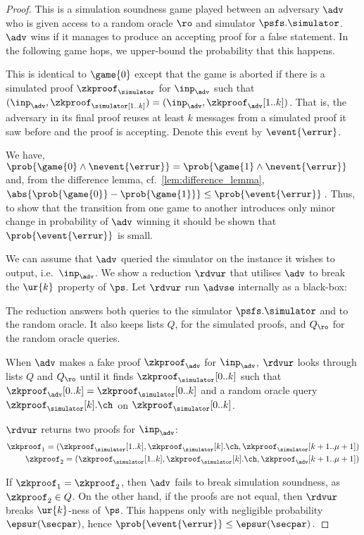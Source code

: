\begin{proof}
	 This is a simulation soundness game played between an adversary
	$\adv$ who is given access to a random oracle $\ro$ and simulator
	$\psfs.\simulator$. $\adv$ wins if it manages to produce an accepting proof
	for a false statement. In the following game hops, we upper-bound the
	probability that this happens.
	
	 This is identical to $\game{0}$ except that the game is aborted if
	there is a simulated proof $\zkproof_\simulator$ for $\inp_{\adv}$ such that
	$(\inp_{\adv}, \zkproof_\simulator[1..k]) = (\inp_{\adv},
	\zkproof_{\adv}[1..k])$. That is, the adversary in its final proof reuses at
	least $k$ messages from a simulated proof it saw before and the proof is
	accepting.  Denote this event by $\event{\errur}$.
	
	 We have, \( \prob{\game{0} \land
		\nevent{\errur}} = \prob{\game{1} \land \nevent{\errur}} \) and, from the
	difference lemma, cf.~\cref{lem:difference_lemma},
	$ \abs{\prob{\game{0}} - \prob{\game{1}}} \leq \prob{\event{\errur}}\,$.
	Thus, to show that the transition from one game to another introduces only
	minor change in probability of $\adv$ winning it should be shown that
	$\prob{\event{\errur}}$ is small.
	
	We can assume that $\adv$ queried the simulator on the instance it wishes to
	output, i.e.~$\inp_{\adv}$. We show a reduction $\rdvur$ that utilises $\adv$
	to break the $\ur{k}$ property of $\ps$. Let $\rdvur$ run $\advse$ internally
	as a black-box:
	\begin{compactitem}
		\item The reduction answers both queries to the simulator $\psfs.\simulator$
		and to the random oracle.  It also keeps lists $Q$, for the simulated
		proofs, and $Q_\ro$ for the random oracle queries.
		\item When $\adv$ makes a fake proof $\zkproof_{\adv}$ for $\inp_{\adv}$,
		$\rdvur$ looks through lists $Q$ and $Q_\ro$ until it finds
		$\zkproof_{\simulator}[0..k]$ such that
		$\zkproof_{\adv}[0..k] = \zkproof_{\simulator}[0..k]$ and a random oracle
		query $\zkproof_{\simulator}[k].\ch$ on $\zkproof_{\simulator}[0..k]$.
		\item $\rdvur$ returns two proofs for $\inp_{\adv}$:
		\begin{align*}
		\zkproof_1 = (\zkproof_{\simulator}[1..k],
		\zkproof_{\simulator}[k].\ch, \zkproof_{\simulator}[k + 1..\mu + 1])\\
		\zkproof_2 = (\zkproof_{\simulator}[1..k],
		\zkproof_{\simulator}[k].\ch, \zkproof_{\adv}[k + 1..\mu + 1])
		\end{align*}
	\end{compactitem}  
	If $\zkproof_1 = \zkproof_2$, then $\adv$ fails to break simulation soundness,
	as $\zkproof_2 \in Q$. On the other hand, if the proofs are not equal, then
	$\rdvur$ breaks $\ur{k}$-ness of $\ps$. This happens only with negligible
	probability $\epsur(\secpar)$, hence
	\( \prob{\event{\errur}} \leq \epsur(\secpar)\,. \)
	

\end{proof}
